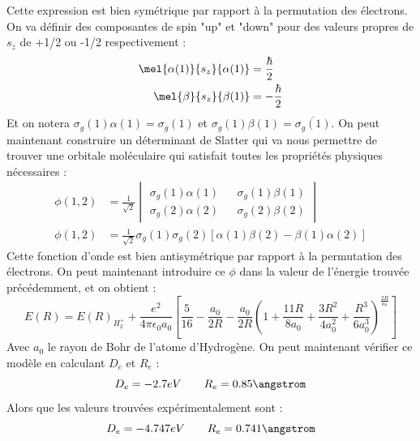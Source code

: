 Cette expression est bien symétrique par rapport à la permutation des électrons.\newline
On va définir des composantes de spin "up" et "down" pour des valeurs propres de $s_z$ de +1/2 ou -1/2 respectivement : 
\begin{equation*}
    \begin{split}
        \mel{\alpha(1)}{s_z}{\alpha(1)} &= \frac{\hbar}{2}\\
        \mel{\beta}{s_z}{\beta(1)} &= -\frac{\hbar}{2}
    \end{split}
\end{equation*}
Et on notera $\sigma_g(1)\alpha(1) = \sigma_g(1)$ et $\sigma_g(1)\beta(1) = \overline{\sigma_g(1)}$.\newline
On peut maintenant construire un déterminant de Slatter qui va nous permettre de trouver une orbitale moléculaire qui satisfait toutes les propriétés physiques nécessaires : 
\begin{equation*}
    \begin{split}
        \phi(1,2) &= \frac{1}{\sqrt{2}}
        \begin{vmatrix}
            \sigma_g(1)\alpha(1) && \sigma_g(1)\beta(1)\\
            \sigma_g(2)\alpha(2) && \sigma_g(2)\beta(2)
        \end{vmatrix}\\
        \phi(1,2) &= \frac{1}{\sqrt{2}}\sigma_g(1)\sigma_g(2)[\alpha(1)\beta(2)-\beta(1)\alpha(2)]
    \end{split}
\end{equation*}
Cette fonction d'onde est bien antisymétrique par rapport à la permutation des électrons.\newline
On peut maintenant introduire ce $\phi$ dans la valeur de l'énergie trouvée précédemment, et on obtient : 
\begin{equation*}
    E(R) = E(R)_{H^+_2} + \frac{e^2}{4\pi\epsilon_0a_0}\left[\frac{5}{16}-\frac{a_0}{2R}-\frac{a_0}{2R}\left(1+\frac{11R}{8a_0}+\frac{3R^2}{4a_0^2}+\frac{R^3}{6a_0^3}\right)^{\frac{2R}{a_0}}\right]
\end{equation*}
Avec $a_0$ le rayon de Bohr de l'atome d'Hydrogène. On peut maintenant vérifier ce modèle en calculant $D_e$ et $R_e$ : 
\begin{equation*}
    D_e = -2.7eV \quad \quad R_e = 0.85\angstrom
\end{equation*}
Alors que les valeurs trouvées expérimentalement sont :
\begin{equation*}
    D_e = -4.747eV \quad \quad R_e = 0.741\angstrom
\end{equation*}
